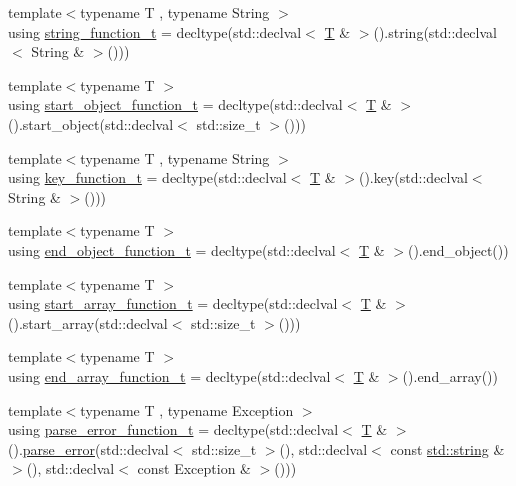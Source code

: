 \begin{DoxyCompactItemize}
\item 
{\footnotesize template$<$typename T , typename String $>$ }\\using \mbox{\hyperlink{namespacenlohmann_1_1detail_a27c3fc3bd42ac406f763184aa8ae4cb0}{string\+\_\+function\+\_\+t}} = decltype(std\+::declval$<$ \mbox{\hyperlink{_keyboard_event_8h_adf1f3edb9115acb0a1e04209b7a9937b}{T}} \& $>$().string(std\+::declval$<$ String \& $>$()))
\item 
{\footnotesize template$<$typename T $>$ }\\using \mbox{\hyperlink{namespacenlohmann_1_1detail_a5fff1e6dcaabd367d9b1109a5682f9d4}{start\+\_\+object\+\_\+function\+\_\+t}} = decltype(std\+::declval$<$ \mbox{\hyperlink{_keyboard_event_8h_adf1f3edb9115acb0a1e04209b7a9937b}{T}} \& $>$().start\+\_\+object(std\+::declval$<$ std\+::size\+\_\+t $>$()))
\item 
{\footnotesize template$<$typename T , typename String $>$ }\\using \mbox{\hyperlink{namespacenlohmann_1_1detail_a44869ca9f422b260625d78e4e8121559}{key\+\_\+function\+\_\+t}} = decltype(std\+::declval$<$ \mbox{\hyperlink{_keyboard_event_8h_adf1f3edb9115acb0a1e04209b7a9937b}{T}} \& $>$().key(std\+::declval$<$ String \& $>$()))
\item 
{\footnotesize template$<$typename T $>$ }\\using \mbox{\hyperlink{namespacenlohmann_1_1detail_af52d6d2521c386998ae940d118182ebc}{end\+\_\+object\+\_\+function\+\_\+t}} = decltype(std\+::declval$<$ \mbox{\hyperlink{_keyboard_event_8h_adf1f3edb9115acb0a1e04209b7a9937b}{T}} \& $>$().end\+\_\+object())
\item 
{\footnotesize template$<$typename T $>$ }\\using \mbox{\hyperlink{namespacenlohmann_1_1detail_a80273cecc45765d7b2826ec931fbffdd}{start\+\_\+array\+\_\+function\+\_\+t}} = decltype(std\+::declval$<$ \mbox{\hyperlink{_keyboard_event_8h_adf1f3edb9115acb0a1e04209b7a9937b}{T}} \& $>$().start\+\_\+array(std\+::declval$<$ std\+::size\+\_\+t $>$()))
\item 
{\footnotesize template$<$typename T $>$ }\\using \mbox{\hyperlink{namespacenlohmann_1_1detail_aec53c029383b34a72182210e58fadb79}{end\+\_\+array\+\_\+function\+\_\+t}} = decltype(std\+::declval$<$ \mbox{\hyperlink{_keyboard_event_8h_adf1f3edb9115acb0a1e04209b7a9937b}{T}} \& $>$().end\+\_\+array())
\item 
{\footnotesize template$<$typename T , typename Exception $>$ }\\using \mbox{\hyperlink{namespacenlohmann_1_1detail_a264d4d58bc1fd82bcc7bf6bf73d6acad}{parse\+\_\+error\+\_\+function\+\_\+t}} = decltype(std\+::declval$<$ \mbox{\hyperlink{_keyboard_event_8h_adf1f3edb9115acb0a1e04209b7a9937b}{T}} \& $>$().\mbox{\hyperlink{classnlohmann_1_1detail_1_1parse__error}{parse\+\_\+error}}(std\+::declval$<$ std\+::size\+\_\+t $>$(), std\+::declval$<$ const \mbox{\hyperlink{namespacenlohmann_1_1detail_a1ed8fc6239da25abcaf681d30ace4985ab45cffe084dd3d20d928bee85e7b0f21}{std\+::string}} \& $>$(), std\+::declval$<$ const Exception \& $>$()))

\end{DoxyCompactItemize}
